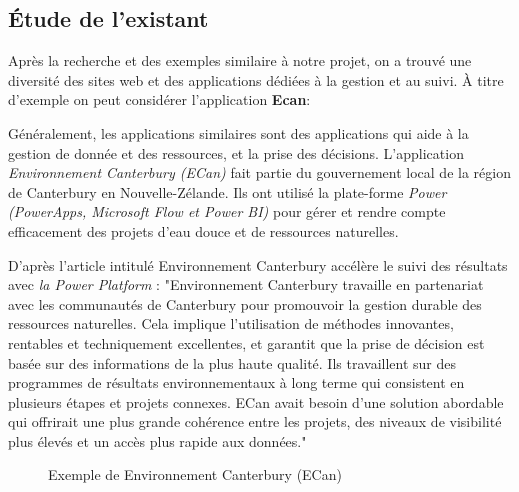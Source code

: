 \documentclass[a4paper]{report}
\begin{document}
\begin{doublespace}
	\subsection{Étude de l’existant}
	
	Après la recherche et des exemples similaire à notre projet, on a
	trouvé une diversité des sites web et des applications dédiées à la gestion et
	au suivi.
	À titre d'exemple on peut considérer l'application \textbf{\large Ecan}:
	
	Généralement, les applications similaires sont des applications qui
	aide à la gestion de donnée et des ressources, et la prise des décisions.
	L’application \emph{Environnement Canterbury (ECan)} fait partie du
	gouvernement local de la région de Canterbury en Nouvelle-Zélande. Ils ont
	utilisé la plate-forme \emph{Power
		(PowerApps, Microsoft Flow et Power BI)} pour gérer et rendre compte
	efficacement des projets d'eau douce et de ressources naturelles.
	
	D’après l'article intitulé Environnement Canterbury accélère le suivi
	des
	résultats avec \emph{la Power Platform} :
	"Environnement Canterbury travaille en partenariat avec les communautés
	de
	Canterbury pour promouvoir la gestion durable des ressources
	naturelles. Cela
	implique l'utilisation de méthodes innovantes, rentables et
	techniquement
	excellentes, et garantit que la prise de décision est basée sur des
	informations
	de la plus haute qualité. Ils travaillent sur des programmes de
	résultats
	environnementaux à long terme qui consistent en plusieurs étapes et
	projets
	connexes. ECan avait besoin d'une solution abordable qui offrirait une
	plus
	grande cohérence entre les projets, des niveaux de visibilité plus
	élevés et un
	accès plus rapide aux données."
	\begin{figure}[H]
		\begin{center}
			\caption{Exemple de Environnement Canterbury (ECan)}
		\end{center}
	\end{figure}
	\newpage

\end{doublespace}
\end{document}
